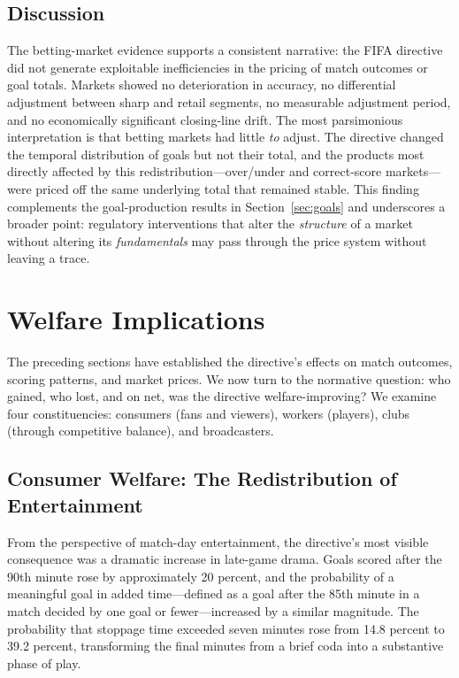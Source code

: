 \subsection{Discussion}

The betting-market evidence supports a consistent narrative: the FIFA
directive did not generate exploitable inefficiencies in the pricing of
match outcomes or goal totals. Markets showed no deterioration in
accuracy, no differential adjustment between sharp and retail segments, no
measurable adjustment period, and no economically significant closing-line
drift. The most parsimonious interpretation is that betting markets had
little \emph{to} adjust. The directive changed the temporal distribution
of goals but not their total, and the products most directly affected by
this redistribution---over/under and correct-score markets---were priced
off the same underlying total that remained stable. This finding
complements the goal-production results in Section~\ref{sec:goals} and
underscores a broader point: regulatory interventions that alter the
\emph{structure} of a market without altering its \emph{fundamentals} may
pass through the price system without leaving a trace.



\section{Welfare Implications}\label{sec:welfare}

The preceding sections have established the directive's effects on match
outcomes, scoring patterns, and market prices. We now turn to the
normative question: who gained, who lost, and on net, was the directive
welfare-improving? We examine four constituencies: consumers (fans and
viewers), workers (players), clubs (through competitive balance), and
broadcasters.

\subsection{Consumer Welfare: The Redistribution of Entertainment}\label{subsec:consumer}

From the perspective of match-day entertainment, the directive's most
visible consequence was a dramatic increase in late-game drama. Goals
scored after the 90th minute rose by approximately 20 percent, and the
probability of a meaningful goal in added time---defined as a goal after
the 85th minute in a match decided by one goal or fewer---increased by a
similar magnitude. The probability that stoppage time exceeded seven
minutes rose from 14.8 percent to 39.2 percent, transforming the final
minutes from a brief coda into a substantive phase of play.


